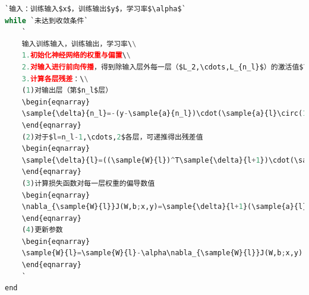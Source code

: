 \begin{lstlisting}[language=python]
`输入：训练输入$x$，训练输出$y$，学习率$\alpha$`
while `未达到收敛条件`
    `
	输入训练输入，训练输出，学习率\\
	1.初始化神经网络的权重与偏置\\
	2.对输入进行前向传播，得到除输入层外每一层（$L_2,\cdots,L_{n_l}$）的激活值$\sample{a}{2},\cdots,\sample{a}{n_l}$\\
	3.计算各层残差：\\
	(1)对输出层（第$n_l$层）
	\begin{eqnarray}
	\sample{\delta}{n_l}=-(y-\sample{a}{n_l})\cdot(\sample{a}{l}\circ(1-\sample{a}{l}))
	\end{eqnarray}
	(2)对于$l=n_l-1,\cdots,2$各层，可递推得出残差值
	\begin{eqnarray}
	\sample{\delta}{l}=((\sample{W}{l})^T\sample{\delta}{l+1})\cdot(\sample{a}{l})
	\end{eqnarray}
	(3)计算损失函数对每一层权重的偏导数值
	\begin{eqnarray}
	\nabla_{\sample{W}{l}}J(W,b;x,y)=\sample{\delta}{l+1}(\sample{a}{l})^T
	\end{eqnarray}
	(4)更新参数
	\begin{eqnarray}
	\sample{W}{l}=\sample{W}{l}-\alpha\nabla_{\sample{W}{l}}J(W,b;x,y)
	\end{eqnarray}
    `
end

\end{lstlisting}

